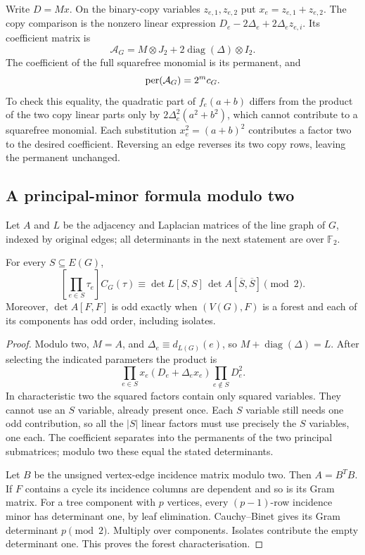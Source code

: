 Write $D=Mx$. On the binary-copy variables $z_{e,1},z_{e,2}$ put
$x_e=z_{e,1}+z_{e,2}$. The copy comparison is the nonzero linear
expression $D_e-2\Delta_e+2\Delta_e z_{e,i}$. Its coefficient matrix is
\[
 \mathcal A_G=M\otimes J_2+2\operatorname{diag}(\Delta)\otimes I_2.
\]
The coefficient of the full squarefree monomial is its permanent,
and
\begin{equation}\label{eq:permanent}
 \operatorname{per}(\mathcal A_G)=2^m c_G.
\end{equation}
To check this equality, the quadratic part of $f_e(a+b)$ differs
from the product of the two copy linear parts only by
$2\Delta_e^2(a^2+b^2)$, which cannot contribute to a squarefree
monomial. Each substitution $x_e^2=(a+b)^2$ contributes a factor
two to the desired coefficient. Reversing an edge reverses its two
copy rows, leaving the permanent unchanged.

\subsection{A principal-minor formula modulo two}

Let $A$ and $L$ be the adjacency and Laplacian matrices of the line
graph of $G$, indexed by original edges; all determinants in the
next statement are over $\mathbb F_2$.

\begin{theorem}\label{thm:modtwo}
For every $S\subseteq E(G)$,
\[
 [\prod_{e\in S}\tau_e]C_G(\tau)
 \equiv\det L[S,S]\,\det A[\overline S,\overline S]\pmod2.
\]
Moreover, $\det A[F,F]$ is odd exactly when $(V(G),F)$ is a
forest and each of its components has odd order, including isolates.
\end{theorem}
\begin{proof}
Modulo two, $M=A$, and
$\Delta_e\equiv d_{L(G)}(e)$, so $M+\operatorname{diag}(\Delta)=L$.
After selecting the indicated parameters the product is
\[
 \prod_{e\in S}x_e(D_e+\Delta_e x_e)
 \prod_{e\notin S}D_e^2.
\]
In characteristic two the squared factors contain only squared
variables. They cannot use an $S$ variable, already present once.
Each $S$ variable still needs one odd contribution, so all the
$|S|$ linear factors must use precisely the $S$ variables, one each.
The coefficient separates into the permanents of the two principal
submatrices; modulo two these equal the stated determinants.

Let $B$ be the unsigned vertex-edge incidence matrix modulo two.
Then $A=B^TB$. If $F$ contains a cycle its incidence columns are
dependent and so is its Gram matrix. For a tree component with $p$
vertices, every $(p-1)$-row incidence minor has determinant one,
by leaf elimination. Cauchy--Binet gives its Gram determinant
$p\pmod2$. Multiply over components. Isolates contribute the
empty determinant one. This proves the forest characterisation.
\end{proof}

